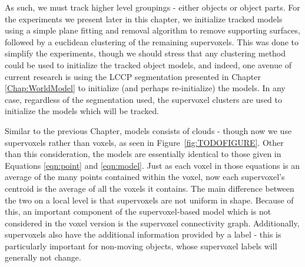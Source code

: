 
As such, we must track higher level groupings - either objects or object parts. For the experiments we present later in this chapter, we initialize tracked models using a simple plane fitting and removal algorithm to remove supporting surfaces, followed by a euclidean clustering \cite{Radu3dIsHere} of the remaining supervoxels. This was done to simplify the experiments, though we should stress that any clustering method could be used to initialize the tracked object models, and indeed, one avenue of current research is using the LCCP segmentation presented in Chapter \ref{Chap:WorldModel} to initialize (and perhaps re-initialize) the models. In any case, regardless of the segmentation used, the supervoxel clusters are used to initialize the models which will be tracked. 

Similar to the previous Chapter, models consists of clouds - though now we use supervoxels rather than voxels, as seen in Figure~\ref{fig:TODOFIGURE}. Other than this consideration, the models are essentially identical to those given in Equations \ref{eqn:point} and \ref{eqn:model}. Just as each voxel in those equations is an average of the many points contained within the voxel, now each supervoxel's centroid is the average of all the voxels it contains. The main difference between the two on a local level is that supervoxels are not uniform in shape. Because of this, an important component of the supervoxel-based model which is not considered in the voxel version is the supervoxel connectivity graph. Additionally, supervoxels also have the additional information provided by a label - this is particularly important for non-moving objects, whose supervoxel labels will generally not change.


